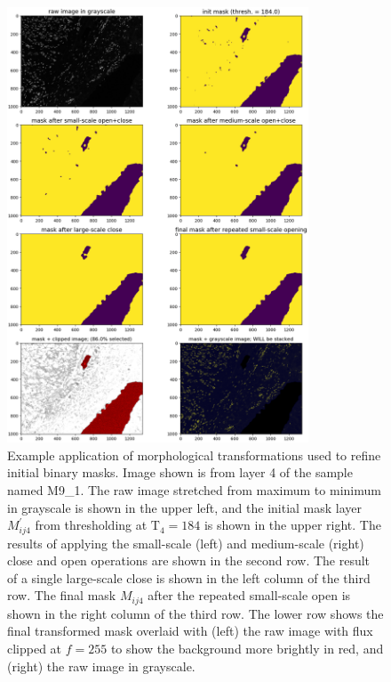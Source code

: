 \documentclass[letterpaper,11pt]{article}
\newcommand{\Tau}{\mathrm{T}}
\begin{document}
\begin{figure}[!ht]
\centering
\includegraphics[width=0.8\textwidth]{images/masking/image_17602_layer_4_masks}
\caption{\footnotesize Example application of morphological transformations used to refine initial binary masks. Image shown is from layer 4 of the sample named M9\_1. The raw image stretched from maximum to minimum in grayscale is shown in the upper left, and the initial mask layer $M^{\prime}_{ij4}$ from thresholding at $\Tau_{4}=184$ is shown in the upper right. The results of applying the small-scale (left) and medium-scale (right) close and open operations are shown in the second row. The result of a single large-scale close is shown in the left column of the third row. The final mask $M_{ij4}$ after the repeated small-scale open is shown in the right column of the third row. The lower row shows the final transformed mask overlaid with (left) the raw image with flux clipped at $f=255$ to show the background more brightly in red, and (right) the raw image in grayscale.}
\label{fig:mask_example_max}
\end{figure}

\clearpage
\end{document}
